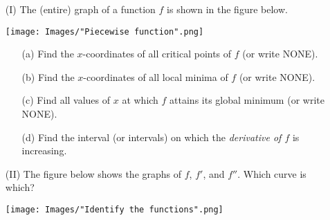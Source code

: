 \documentclass[handout,nooutcomes]{ximera}
\begin{document}
\begin{problem}
  \begin{itemize}
    \item[(I)]
      The (entire) graph of a function $f$ is shown in the figure below.
      \begin{image}
        \texttt{[image: Images/"Piecewise function".png]}
      \end{image}
      \begin{itemize}
        \item[(a)]
          Find the $x$-coordinates of all critical points of $f$ (or write NONE).

        \item[(b)]
          Find the $x$-coordinates of all local minima of $f$ (or write NONE).

        \item[(c)]
          Find all values of $x$ at which $f$ attains its global minimum (or write NONE).

        \item[(d)]
          Find the interval (or intervals) on which the \emph{derivative of $f$} is increasing.
      \end{itemize}

    \item[(II)]
      The figure below shows the graphs of $f$, $f'$, and $f''$.
      Which curve is which?
      \begin{image}
        \texttt{[image: Images/"Identify the functions".png]}
      \end{image}

  \end{itemize}
\end{problem}
\end{document}
